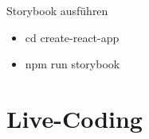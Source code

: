 \documentclass{beamer}
\begin{document}
\begin{frame}{Storybook ausführen}
	\begin{itemize}
		\item cd create-react-app
		\item npm run storybook
	\end{itemize}
\end{frame}

\section{Live-Coding} %



\appendix



\end{document}

